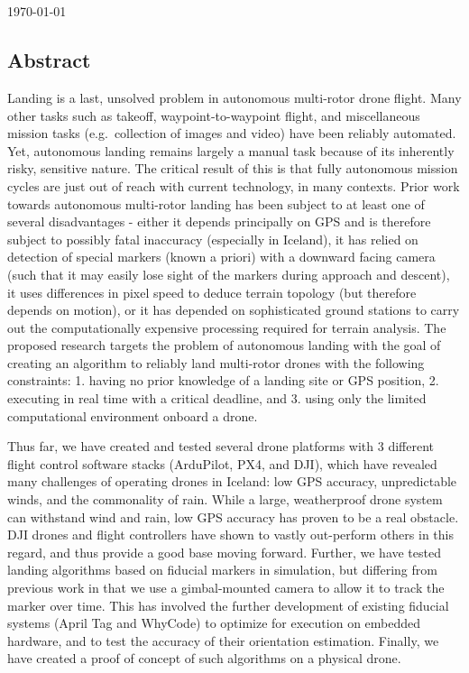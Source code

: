 \begin{center}
    \Large
    \textbf{\documenttitle}
    ~\\[0.5cm]
    \documentauthor
    ~\\[0.5cm]
    \specialdate\today
\end{center}

\subsection*{Abstract}

Landing is a last, unsolved problem in autonomous multi-rotor drone flight.
Many other tasks such as takeoff, waypoint-to-waypoint flight,
and miscellaneous mission tasks (e.g.~collection of images and video) have been reliably automated.
Yet, autonomous landing remains largely a manual task because of its inherently risky, sensitive nature.
The critical result of this is that fully autonomous mission cycles are just out of reach with current technology, in many contexts.
Prior work towards autonomous multi-rotor landing has been subject to at least one of several disadvantages -
either it depends principally on GPS and is therefore subject to possibly fatal inaccuracy (especially in Iceland),
it has relied on detection of special markers (known a priori) with a downward facing camera (such that it may easily lose sight of the markers during approach and descent),
it uses differences in pixel speed to deduce terrain topology (but therefore depends on motion),
or it has depended on sophisticated ground stations to carry out the computationally expensive processing required for terrain analysis.
The proposed research targets the problem of autonomous landing
with the goal of creating an algorithm to reliably land multi-rotor drones
with the following constraints:
1. having no prior knowledge of a landing site or GPS position,
2. executing in real time with a critical deadline, and
3. using only the limited computational environment onboard a drone.

Thus far, we have created and tested several drone platforms with 3 different flight control software stacks (ArduPilot, PX4, and DJI),
which have revealed many challenges of operating drones in Iceland: low GPS accuracy, unpredictable winds, and the commonality of rain.
While a large, weatherproof drone system can withstand wind and rain, low GPS accuracy has proven to be a real obstacle.
DJI drones and flight controllers have shown to vastly out-perform others in this regard, and thus provide a good base moving forward.
Further, we have tested landing algorithms based on fiducial markers in simulation,
but differing from previous work in that we use a gimbal-mounted camera to allow it to track the marker over time.
This has involved the further development of existing fiducial systems (April Tag and WhyCode) to optimize for execution on embedded hardware,
and to test the accuracy of their orientation estimation.
Finally, we have created a proof of concept of such algorithms on a physical drone.

